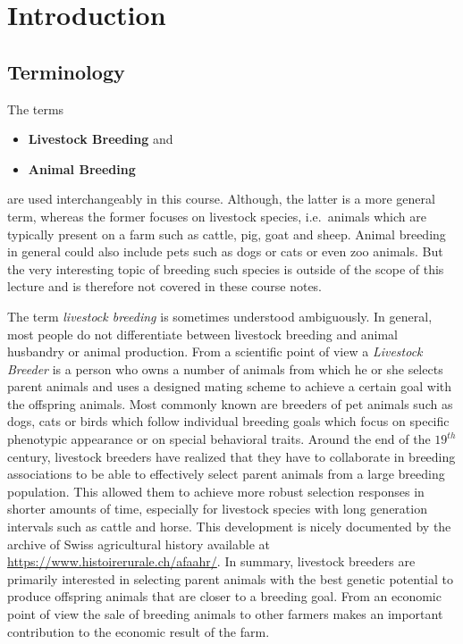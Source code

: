 \documentclass[
]{book}
\providecommand{\tightlist}{%
  \setlength{\itemsep}{0pt}\setlength{\parskip}{0pt}}
\begin{document}
\hypertarget{intro-lbg}{%
\chapter{Introduction}\label{intro-lbg}}

\hypertarget{intro-lbg-terminology}{%
\section{Terminology}\label{intro-lbg-terminology}}

The terms

\begin{itemize}
\tightlist
\item
  \textbf{Livestock Breeding} and
\item
  \textbf{Animal Breeding}
\end{itemize}

are used interchangeably in this course. Although, the latter is a more general term, whereas the former focuses on livestock species, i.e.~animals which are typically present on a farm such as cattle, pig, goat and sheep. Animal breeding in general could also include pets such as dogs or cats or even zoo animals. But the very interesting topic of breeding such species is outside of the scope of this lecture and is therefore not covered in these course notes.

The term \emph{livestock breeding} is sometimes understood ambiguously. In general, most people do not differentiate between livestock breeding and animal husbandry or animal production. From a scientific point of view a \emph{Livestock Breeder} is a person who owns a number of animals from which he or she selects parent animals and uses a designed mating scheme to achieve a certain goal with the offspring animals. Most commonly known are breeders of pet animals such as dogs, cats or birds which follow individual breeding goals which focus on specific phenotypic appearance or on special behavioral traits. Around the end of the \(19^{th}\) century, livestock breeders have realized that they have to collaborate in breeding associations to be able to effectively select parent animals from a large breeding population. This allowed them to achieve more robust selection responses in shorter amounts of time, especially for livestock species with long generation intervals such as cattle and horse. This development is nicely documented by the archive of Swiss agricultural history available at \url{https://www.histoirerurale.ch/afaahr/}. In summary, livestock breeders are primarily interested in selecting parent animals with the best genetic potential to produce offspring animals that are closer to a breeding goal. From an economic point of view the sale of breeding animals to other farmers makes an important contribution to the economic result of the farm.
\end{document}
